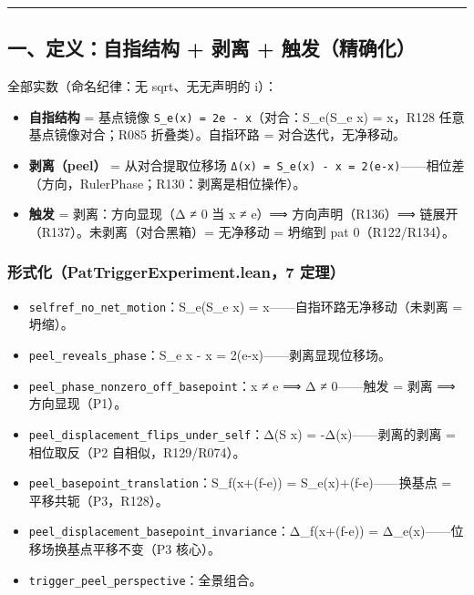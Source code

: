 \documentclass[
]{article}
\providecommand{\tightlist}{%
  \setlength{\itemsep}{0pt}\setlength{\parskip}{0pt}}
\begin{document}
\begin{center}\rule{0.5\linewidth}{0.5pt}\end{center}

\subsection{一、定义：自指结构 + 剥离 +
触发（精确化）}\label{ux4e00ux5b9aux4e49ux81eaux6307ux7ed3ux6784-ux5265ux79bb-ux89e6ux53d1ux7cbeux786eux5316}

全部实数（命名纪律：无 sqrt、无无声明的 i）：

\begin{itemize}
\tightlist
\item
  \textbf{自指结构} = 基点镜像
  \texttt{S\_e(x)\ =\ 2e\ -\ x}（对合：S\_e(S\_e x) = x，R128
  任意基点镜像对合；R085 折叠类）。自指环路 = 对合迭代，无净移动。
\item
  \textbf{剥离（peel）} = 从对合提取位移场
  \texttt{Δ(x)\ =\ S\_e(x)\ -\ x\ =\ 2(e-x)}------相位差（方向，RulerPhase；R130：剥离是相位操作）。
\item
  \textbf{触发} = 剥离：方向显现（Δ ≠ 0 当 x ≠ e）⟹ 方向声明（R136）⟹
  链展开（R137）。未剥离（对合黑箱）= 无净移动 = 坍缩到 pat
  0（R122/R134）。
\end{itemize}

\subsubsection{形式化（PatTriggerExperiment.lean，7
定理）}\label{ux5f62ux5f0fux5316pattriggerexperiment.lean7-ux5b9aux7406}

\begin{itemize}
\tightlist
\item
  \texttt{selfref\_no\_net\_motion}：S\_e(S\_e x) =
  x------自指环路无净移动（未剥离 = 坍缩）。
\item
  \texttt{peel\_reveals\_phase}：S\_e x - x =
  2(e-x)------剥离显现位移场。
\item
  \texttt{peel\_phase\_nonzero\_off\_basepoint}：x ≠ e ⟹ Δ ≠ 0------触发
  = 剥离 ⟹ 方向显现（P1）。
\item
  \texttt{peel\_displacement\_flips\_under\_self}：Δ(S x) =
  -Δ(x)------剥离的剥离 = 相位取反（P2 自相似，R129/R074）。
\item
  \texttt{peel\_basepoint\_translation}：S\_f(x+(f-e)) =
  S\_e(x)+(f-e)------换基点 = 平移共轭（P3，R128）。
\item
  \texttt{peel\_displacement\_basepoint\_invariance}：Δ\_f(x+(f-e)) =
  Δ\_e(x)------位移场换基点平移不变（P3 核心）。
\item
  \texttt{trigger\_peel\_perspective}：全景组合。
\end{itemize}
\end{document}

